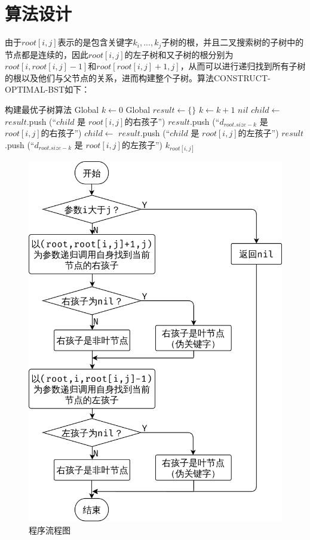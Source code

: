 \documentclass{report}
\begin{document}
\section{算法设计}
\label{sec:suan_fa_she_ji_3}
由于$root[i,j]$表示的是包含关键字$k_i,...,k_j$子树的根，并且二叉搜索树的子树中的节点都是连续的，因此$root[i,j]$的左子树和又子树的根分别为$root[i, root[i,j]-1]$和$root[root[i,j]+1, j]$，从而可以进行递归找到所有子树的根以及他们与父节点的关系，进而构建整个子树。算法CONSTRUCT-OPTIMAL-BST如下：\par
\begin{simpleAlgorithm}{构建最优子树算法}
    \State Global $k \gets 0$ 
    \State Global $result \gets \{\}$ 
        \State $k \gets k+1$
        \State \Return$nil$
    \EndIf
    \State $child \gets$ 
            \State $result$.push (``$child$ 是 $root[i,j]$的右孩子'')
        \Else
            \State $result$.push (``$d_{root.size-k}$ 是 $root[i,j]$的右孩子'')
        \EndIf
        \State $child \gets$ 
            \State $result$.push (``$child$ 是 $root[i,j]$的左孩子'')
        \Else
            \State $result$.push (``$d_{root.size-k}$ 是 $root[i,j]$的左孩子'')
        \EndIf
        \State \Return $k_{root[i,j]}$
    \EndProcedure
\end{simpleAlgorithm}

\begin{figure}[ht]
    \centering
    \includegraphics[width=0.4\linewidth]{flowchart3.png}
    \caption{程序流程图}
    \label{fig:flowchart3}
\end{figure}
\end{document}
